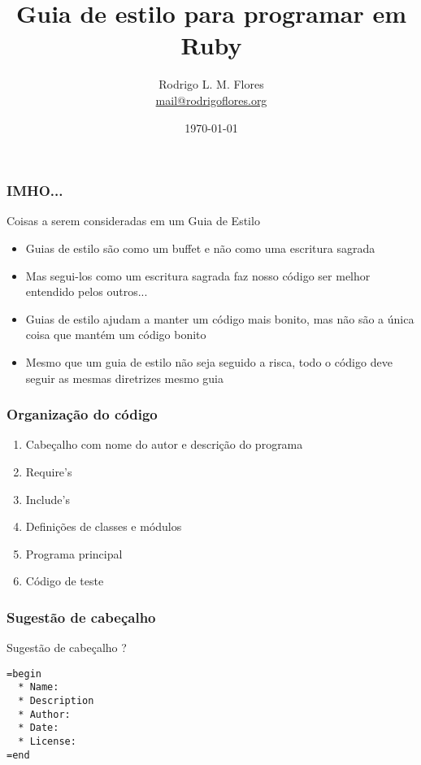 \documentclass{beamer}
\title{Guia de estilo para programar em Ruby}
\author{Rodrigo L. M. Flores \\ \url{mail@rodrigoflores.org}}
\institute{Projeto Archlinux-BR}
\begin{document}
\date{\today}

\frame{\titlepage}

\begin{frame}
    \frametitle{IMHO...}
    \begin{block}{Coisas a serem consideradas em um Guia de Estilo}
        \begin{itemize}
            \item Guias de estilo são como um buffet e não como uma escritura sagrada
            \item Mas segui-los como um escritura sagrada faz nosso código ser melhor entendido pelos outros...
            \item Guias de estilo ajudam a manter um código mais bonito, mas não são a única coisa que mantém um código bonito
            \item Mesmo que um guia de estilo não seja seguido a risca, todo o código deve seguir as mesmas diretrizes mesmo guia
        \end{itemize}
    \end{block}
\end{frame}

\begin{frame}
    \frametitle{Organização do código}
    \begin{enumerate}
        \item Cabeçalho com nome do autor e descrição do programa
        \item Require's
        \item Include's
        \item Definições de classes e módulos
        \item Programa principal
        \item Código de teste
    \end{enumerate}
\end{frame}


\begin{frame}[fragile]
    \frametitle{Sugestão de cabeçalho}
    \begin{block}{Sugestão de cabeçalho ?}
        \begin{verbatim}
=begin
  * Name:
  * Description   
  * Author:
  * Date:
  * License:
=end
        \end{verbatim}


    \end{block}


\end{frame}
\end{document}
